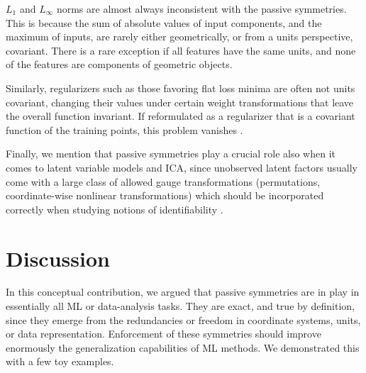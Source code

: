 \documentclass{article}
\theoremstyle{plain}
\theoremstyle{definition}
\theoremstyle{remark}
\begin{document}
$L_1$ and $L_\infty$ norms are almost always inconsistent with the passive symmetries.
This is because the sum of absolute values of input components, and the maximum of inputs, are rarely either geometrically, or from a units perspective, covariant.
There is a rare exception if all features have the same units, and none of the features are components of geometric objects.

Similarly, regularizers such as those favoring flat loss minima \cite{flatminima,sharpminima,petzka2021relative} are often not units covariant, changing their values under certain weight transformations that leave the overall function invariant. If reformulated as a regularizer that is a covariant function of the training points, this problem vanishes \cite{LuxburgBS04}.

Finally, we mention that passive symmetries play a crucial role also when it comes to latent variable models and ICA, since unobserved latent factors usually come with a large class of allowed gauge transformations (permutations, coordinate-wise nonlinear transformations) which should be incorporated correctly when studying notions of identifiability \cite{khemakhem2020ice, BucBesSch22}.

\section{Discussion}\label{sec:discussion}


In this conceptual contribution,
we argued that passive symmetries are in play in essentially all ML or data-analysis tasks.
They are exact, and true by definition, since they emerge from the redundancies or freedom in coordinate systems, units, or data representation.
Enforcement of these symmetries should improve enormously the generalization capabilities of ML methods.
We demonstrated this with a few toy examples.
\end{document}
